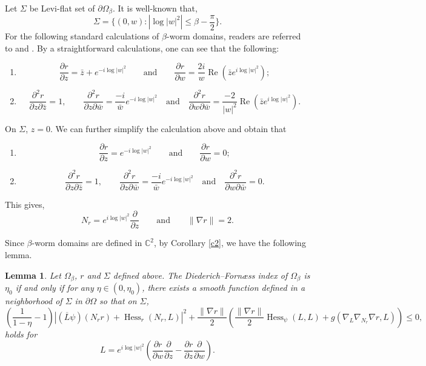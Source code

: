 \documentclass[11pt]{article}
\theoremstyle{plain} \numberwithin{equation}{section}
\newtheorem{lemma}[theorem]{Lemma}
\theoremstyle{definition}
\DeclareMathOperator{\Hessian}{Hess}
\renewcommand{\Re}{\operatorname{Re}}
\begin{document}
Let $\Sigma$ be Levi-flat set of $\partial\Omega_\beta$. It is well-known that, \[\Sigma=\lbrace (0, w): \left|\log|w|^2\right|\leq \beta-\frac{\pi}{2}\rbrace.\] For the following standard calculations of $\beta$-worm domains, readers are referred to \citep{DF77a} and \citep{KP08}. By a straightforward calculations, one can see that the following: \begin{enumerate}
	\item \[\frac{\partial r}{\partial z}=\bar{z}+e^{-i\log|w|^2}\qquad\text{and}\qquad\frac{\partial r}{\partial w}=\frac{2i}{w}\Re(\bar{z}e^{i\log|w|^2});\] 
	\item \[\frac{\partial^2 r}{\partial z\partial\bar{z}}=1,\qquad\frac{\partial^2 r}{\partial z\partial\bar{w}}=\frac{-i}{\bar{w}}e^{-i\log|w|^2}\quad\text{and}\quad\frac{\partial^2 r}{\partial w\partial\bar{w}}=\frac{-2}{|w|^2}\Re(\bar{z}e^{i\log|w|^2}).\]
\end{enumerate}  On $\Sigma$, $z=0$. We can further simplify the calculation above and obtain that
\begin{enumerate}
	\item \[\frac{\partial r}{\partial z}=e^{-i\log|w|^2}\qquad\text{and}\qquad\frac{\partial r}{\partial w}=0;\] 
	\item \[\frac{\partial^2 r}{\partial z\partial\bar{z}}=1,\qquad\frac{\partial^2 r}{\partial z\partial\bar{w}}=\frac{-i}{\bar{w}}e^{-i\log|w|^2}\quad\text{and}\quad\frac{\partial^2 r}{\partial w\partial\bar{w}}=0.\]
\end{enumerate}

This gives, 
\[N_r=e^{i\log|w|^2}\frac{\partial}{\partial z}\qquad\text{and}\qquad\|\nabla r\|=2.\]  

 Since $\beta$-worm domains are defined in $\mathbb{C}^2$, by Corollary \ref{c2}, we have the following lemma.
 
 \begin{lemma}
 	Let $\Omega_\beta$, $r$ and $\Sigma$ defined above. The Diederich--Forn\ae ss index of $\Omega_\beta$ is $\eta_0$ if and only if for any $\eta\in (0,\eta_0)$, there exists a smooth function defined in a neighborhood of $\Sigma$ in $\partial\Omega$ so that on $\Sigma$, \begin{equation}\label{start}
 	\left(\frac{1}{1-\eta}-1\right)\left|(\overline{L}\psi)(N_rr)+\Hessian_r(N_r, L)\right|^2+\frac{\|\nabla r\|}{2}\left(\frac{\|\nabla r\|}{2}\Hessian_\psi(L, L)+g(\nabla_L\nabla_{N_r}\nabla r, L)\right)\leq 0,
 	\end{equation}
 	holds for \[L=e^{i\log |w|^2}\left(\frac{\partial r}{\partial w}\frac{\partial}{\partial z}-\frac{\partial r}{\partial z}\frac{\partial}{\partial w}\right).\]
 \end{lemma}
\end{document}
